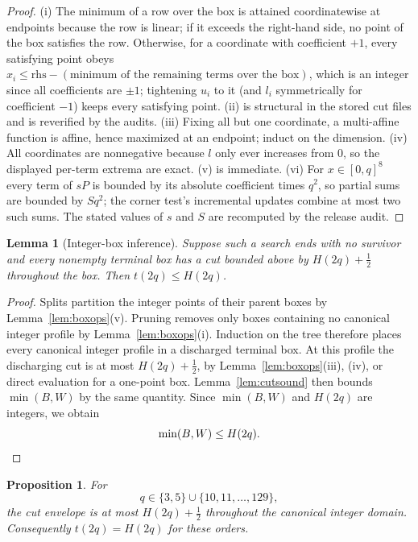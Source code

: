 \documentclass[11pt]{amsart}
\newtheorem{lemma}[theorem]{Lemma}
\newtheorem{proposition}[theorem]{Proposition}
\theoremstyle{definition}
\theoremstyle{remark}
\begin{document}
\begin{proof}
(i) The minimum of a row over the box is attained coordinatewise at
endpoints because the row is linear; if it exceeds the right-hand side, no
point of the box satisfies the row.  Otherwise, for a coordinate with
coefficient $+1$, every satisfying point obeys
$x_i\le\mathrm{rhs}-(\text{minimum of the remaining terms over the box})$,
which is an integer since all coefficients are $\pm1$; tightening $u_i$ to
it (and $l_i$ symmetrically for coefficient $-1$) keeps every satisfying
point.  (ii) is structural in the stored cut files and is reverified by the
audits.  (iii) Fixing all but one coordinate, a multi-affine function is
affine, hence maximized at an endpoint; induct on the dimension.
(iv) All coordinates are nonnegative because $l$ only ever increases from
$0$, so the displayed per-term extrema are exact.  (v) is immediate.
(vi) For $x\in[0,q]^8$ every term of $sP$ is bounded by its absolute
coefficient times $q^2$, so partial sums are bounded by $Sq^2$; the corner
test's incremental updates combine at most two such sums.  The stated
values of $s$ and $S$ are recomputed by the release audit.
\end{proof}

\begin{lemma}[Integer-box inference]\label{lem:boxsound}
Suppose such a search ends with no survivor and every nonempty terminal box
has a cut bounded above by $H(2q)+\frac12$ throughout the box.  Then
$t(2q)\le H(2q)$.
\end{lemma}

\begin{proof}
Splits partition the integer points of their parent boxes by
Lemma~\ref{lem:boxops}(v).  Pruning removes only boxes containing no canonical
integer profile by Lemma~\ref{lem:boxops}(i).  Induction on the tree therefore
places every canonical integer profile in a discharged terminal box.
At this profile the discharging cut is at most $H(2q)+\frac12$, by
Lemma~\ref{lem:boxops}(iii), (iv), or direct evaluation for a one-point box.
Lemma~\ref{lem:cutsound} then bounds $\min(B,W)$ by the same quantity.
Since $\min(B,W)$ and $H(2q)$ are integers, we obtain
\[\min(B,W)\le H(2q).\qedhere\]
\end{proof}

\begin{proposition}\label{prop:ladder}
For
\[
q\in\{3,5\}\cup\{10,11,\ldots,129\},
\]
the cut envelope is at most $H(2q)+\frac12$ throughout the canonical integer
domain.  Consequently $t(2q)=H(2q)$ for these orders.
\end{proposition}
\end{document}
